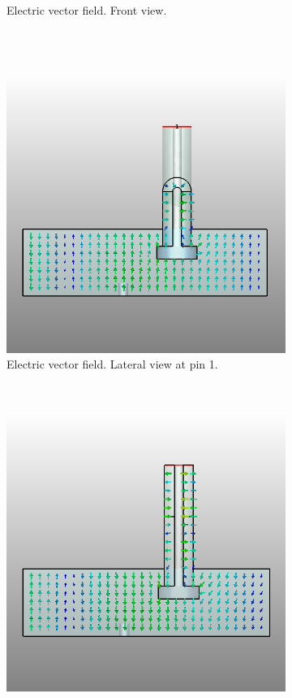 \documentclass[english,twoside]{article}
\begin{document}
\begin{landscape}
\begin{figure}
\begin{subfigure}[b]{0.45\textwidth}
					\caption{Electric vector field. Front view.}
				\end{subfigure}
				\vspace{10pt}\\
				~
				\begin{subfigure}[b]{0.45\textwidth}
					\includegraphics[width=\textwidth]{figures/coaxToWrTE20_alternative_lateral1}
					\caption{Electric vector field. Lateral view at pin 1.}
				\end{subfigure}
				~
				\begin{subfigure}[b]{0.45\textwidth}
					\includegraphics[width=\textwidth]{figures/coaxToWrTE20_alternative_lateral2}

\end{subfigure}
\end{figure}
\end{landscape}
\end{document}
